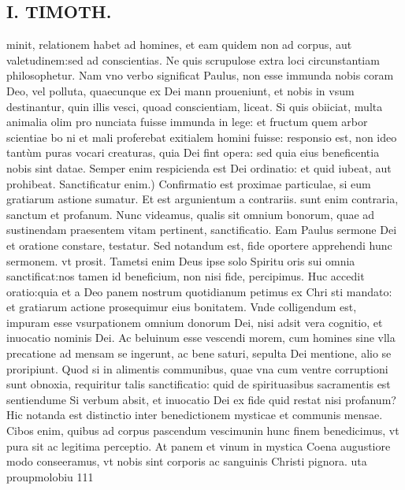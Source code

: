 \documentclass{article}
\begin{document}
\begin{pages}
\section*{I. TIMOTH. }
\marginpar{[ p.48 ]}\pstart minit, relationem habet ad homines, et eam quidem non ad corpus, aut valetudinem:sed ad conscientias. Ne quis scrupulose extra loci circunstantiam philosophetur. Nam vno verbo significat Paulus, non esse immunda nobis coram Deo, vel polluta, quaecunque ex Dei mann proueniunt, et nobis in vsum destinantur, quin illis vesci, quoad conscientiam, liceat. Si quis obiiciat, multa animalia olim pro nunciata fuisse immunda in lege: et fructum quem arbor scientiae bo ni et mali proferebat exitialem homini fuisse: responsio est, non ideo tantùm puras vocari creaturas, quia Dei fint opera: sed quia eius beneficentia nobis sint datae. Semper enim respicienda est Dei ordinatio: et quid iubeat, aut prohibeat.  \pend\pstart Sanctificatur enim.) Confirmatio est proximae particulae, si eum gratiarum astione sumatur. Et est argunientum a contrariis. sunt enim contraria, sanctum et profanum. Nunc videamus, qualis sit omnium bonorum, quae ad sustinendam praesentem vitam pertinent, sanctificatio. Eam Paulus sermone Dei et oratione constare, testatur. Sed notandum est, fide oportere apprehendi hunc sermonem. vt prosit. Tametsi enim Deus ipse solo Spiritu oris sui omnia sanctificat:nos tamen id beneficium, non nisi fide, percipimus. Huc accedit oratio:quia et a Deo panem nostrum quotidianum petimus ex Chri sti mandato: et gratiarum actione prosequimur eius bonitatem. Vnde colligendum est, impuram esse vsurpationem omnium donorum Dei, nisi adsit vera cognitio, et inuocatio nominis Dei. Ac beluinum esse vescendi morem, cum homines sine vlla precatione ad mensam se ingerunt, ac bene saturi, sepulta Dei mentione, alio se proripiunt. Quod si in alimentis communibus, quae vna cum ventre corruptioni sunt obnoxia, requiritur talis sanctificatio: quid de spirituasibus sacramentis est sentiendume Si verbum absit, et inuocatio Dei ex fide quid restat nisi profanum? Hic notanda est distinctio inter benedictionem mysticae et communis mensae. Cibos enim, quibus ad corpus pascendum vescimunin hunc finem benedicimus, vt pura sit ac legitima perceptio. At panem et vinum in mystica Coena augustiore modo conseeramus, vt nobis sint corporis ac sanguinis Christi pignora.  uta proupmolobiu 111  \pend
{}
{}

\end{pages}
\end{document}
